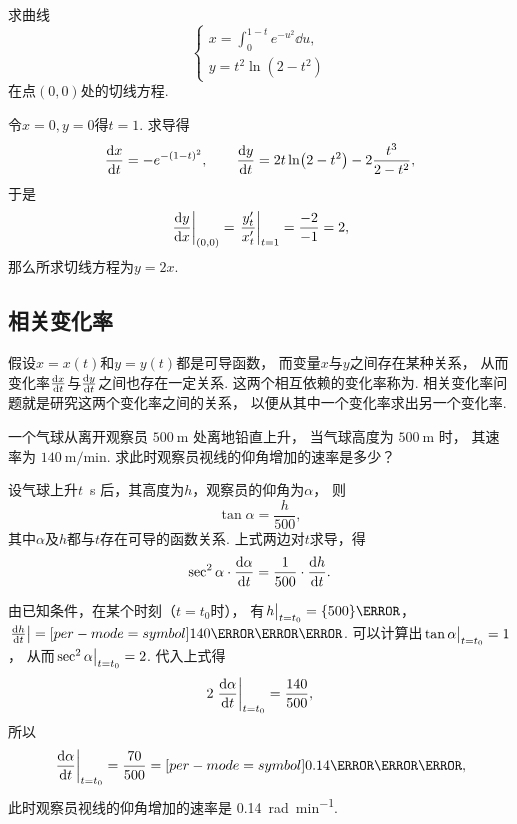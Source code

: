 \begin{example}
求曲线\[
	\left\{ \begin{array}{l}
		x = \int_0^{1-t} e^{-u^2} \dd{u}, \\
		y = t^2 \ln(2-t^2)
	\end{array} \right.
\]在点\((0,0)\)处的切线方程.
\begin{solution}
令\(x = 0, y = 0\)得\(t = 1\).
求导得\[
	\dv{x}{t}
	= -e^{-(1-t)^2},
	\qquad
	\dv{y}{t}
	= 2t \ln(2-t^2) - 2\frac{t^3}{2-t^2},
\]
于是\[
	\eval{\dv{y}{x}}_{(0,0)}
	= \eval{\frac{y'_t}{x'_t}}_{t=1}
	= \frac{-2}{-1}
	= 2,
\]
那么所求切线方程为\(y = 2 x\).
\end{solution}
\end{example}

\subsection{相关变化率}
假设\(x=x(t)\)和\(y=y(t)\)都是可导函数，
而变量\(x\)与\(y\)之间存在某种关系，
从而变化率\(\dv{x}{t}\)与\(\dv{y}{t}\)之间也存在一定关系.
这两个相互依赖的变化率称为.
相关变化率问题就是研究这两个变化率之间的关系，
以便从其中一个变化率求出另一个变化率.

\begin{example}
一个气球从离开观察员 $\qty{500}{\meter}$ 处离地铅直上升，
当气球高度为 $\qty{500}{\meter}$ 时，
其速率为 $\qty[per-mode=symbol]{140}{\meter\per\minute}$.
求此时观察员视线的仰角增加的速率是多少？
\begin{solution}
设气球上升\(t\)~\unit{\second} 后，其高度为\(h\)，观察员的仰角为\(\alpha\)，
则\[
	\tan\alpha=\frac{h}{500},
\]
其中\(\alpha\)及\(h\)都与\(t\)存在可导的函数关系.
上式两边对\(t\)求导，得\[
	\sec^2\alpha \cdot \dv{\alpha}{t}
	= \frac1{500} \cdot \dv{h}{t}.
\]

由已知条件，在某个时刻（\(t=t_0\)时），
有\(\eval{h}_{t=t_0}=\qty{500}{\meter}\)，
\(\eval{\dv{h}{t}}=\qty[per-mode=symbol]{140}{\meter\per\minute}\).
可以计算出\(\eval{\tan\alpha}_{t=t_0}=1\)，
从而\(\eval{\sec^2\alpha}_{t=t_0}=2\).
代入上式得\[
	2 \eval{\dv{\alpha}{t}}_{t=t_0} = \frac{140}{500},
\]
所以\[
	\eval{\dv{\alpha}{t}}_{t=t_0} = \frac{70}{500}
	= \qty[per-mode=symbol]{0.14}{\radian\per\minute},
\]
此时观察员视线的仰角增加的速率是 \qty[per-mode=symbol]{0.14}{\radian\per\minute}.
\end{solution}
\end{example}
